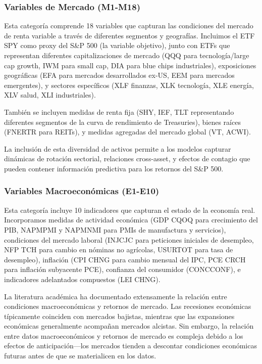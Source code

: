 \documentclass[11pt,a4paper]{article}
\begin{document}
\subsubsection{Variables de Mercado (M1-M18)}

Esta categoría comprende 18 variables que capturan las condiciones del mercado de renta variable a través de diferentes segmentos y geografías. Incluimos el ETF SPY como proxy del S\&P 500 (la variable objetivo), junto con ETFs que representan diferentes capitalizaciones de mercado (QQQ para tecnología/large cap growth, IWM para small cap, DIA para blue chips industriales), exposiciones geográficas (EFA para mercados desarrollados ex-US, EEM para mercados emergentes), y sectores específicos (XLF finanzas, XLK tecnología, XLE energía, XLV salud, XLI industriales).

También se incluyen medidas de renta fija (SHY, IEF, TLT representando diferentes segmentos de la curva de rendimiento de Treasuries), bienes raíces (FNERTR para REITs), y medidas agregadas del mercado global (VT, ACWI).

La inclusión de esta diversidad de activos permite a los modelos capturar dinámicas de rotación sectorial, relaciones cross-asset, y efectos de contagio que pueden contener información predictiva para los retornos del S\&P 500.

\subsubsection{Variables Macroeconómicas (E1-E10)}

Esta categoría incluye 10 indicadores que capturan el estado de la economía real. Incorporamos medidas de actividad económica (GDP CQOQ para crecimiento del PIB, NAPMPMI y NAPMNMI para PMIs de manufactura y servicios), condiciones del mercado laboral (INJCJC para peticiones iniciales de desempleo, NFP TCH para cambio en nóminas no agrícolas, USURTOT para tasa de desempleo), inflación (CPI CHNG para cambio mensual del IPC, PCE CRCH para inflación subyacente PCE), confianza del consumidor (CONCCONF), e indicadores adelantados compuestos (LEI CHNG).

La literatura académica ha documentado extensamente la relación entre condiciones macroeconómicas y retornos de mercado. Las recesiones económicas típicamente coinciden con mercados bajistas, mientras que las expansiones económicas generalmente acompañan mercados alcistas. Sin embargo, la relación entre datos macroeconómicos y retornos de mercado es compleja debido a los efectos de anticipación---los mercados tienden a descontar condiciones económicas futuras antes de que se materialicen en los datos.
\end{document}
